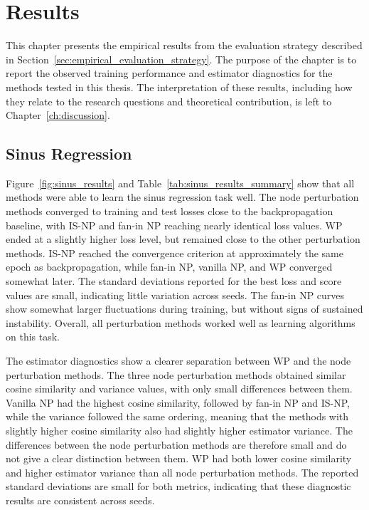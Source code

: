 \section{Results}
\label{ch:results}

This chapter presents the empirical results from the evaluation strategy described in Section~\ref{sec:empirical_evaluation_strategy}. The purpose of the chapter is to report the observed training performance and estimator diagnostics for the methods tested in this thesis. The interpretation of these results, including how they relate to the research questions and theoretical contribution, is left to Chapter~\ref{ch:discussion}.

\subsection{Sinus Regression}

Figure~\ref{fig:sinus_results} and Table~\ref{tab:sinus_results_summary} show that all methods were able to learn the sinus regression task well. The node perturbation methods converged to training and test losses close to the backpropagation baseline, with IS-NP and fan-in NP reaching nearly identical loss values. WP ended at a slightly higher loss level, but remained close to the other perturbation methods. IS-NP reached the convergence criterion at approximately the same epoch as backpropagation, while fan-in NP, vanilla NP, and WP converged somewhat later. The standard deviations reported for the best loss and score values are small, indicating little variation across seeds. The fan-in NP curves show somewhat larger fluctuations during training, but without signs of sustained instability. Overall, all perturbation methods worked well as learning algorithms on this task.

The estimator diagnostics show a clearer separation between WP and the node perturbation methods. The three node perturbation methods obtained similar cosine similarity and variance values, with only small differences between them. Vanilla NP had the highest cosine similarity, followed by fan-in NP and IS-NP, while the variance followed the same ordering, meaning that the methods with slightly higher cosine similarity also had slightly higher estimator variance. The differences between the node perturbation methods are therefore small and do not give a clear distinction between them. WP had both lower cosine similarity and higher estimator variance than all node perturbation methods. The reported standard deviations are small for both metrics, indicating that these diagnostic results are consistent across seeds.

